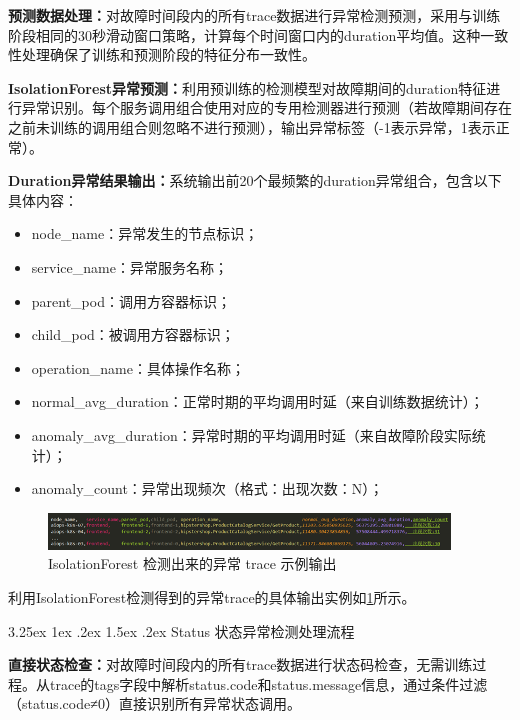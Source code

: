 \documentclass[11pt]{article}
\makeatletter
\renewcommand{\paragraph}{%
    \@startsection{paragraph}{4}{\z@}%
    {3.25ex \@plus1ex \@minus.2ex}%
    {1.5ex \@plus.2ex}%
    {\normalfont\normalsize\bfseries}%
}
\makeatother
\begin{document}
\textbf{预测数据处理：}对故障时间段内的所有trace数据进行异常检测预测，采用与训练阶段相同的30秒滑动窗口策略，计算每个时间窗口内的duration平均值。这种一致性处理确保了训练和预测阶段的特征分布一致性。

\textbf{IsolationForest异常预测：}利用预训练的检测模型对故障期间的duration特征进行异常识别。每个服务调用组合使用对应的专用检测器进行预测（若故障期间存在之前未训练的调用组合则忽略不进行预测），输出异常标签（-1表示异常，1表示正常）。

\textbf{Duration异常结果输出：}系统输出前20个最频繁的duration异常组合，包含以下具体内容：

\begin{itemize}
    \item node\_name：异常发生的节点标识；
    \item service\_name：异常服务名称；
    \item parent\_pod：调用方容器标识；
    \item child\_pod：被调用方容器标识；
    \item operation\_name：具体操作名称；
    \item normal\_avg\_duration：正常时期的平均调用时延（来自训练数据统计）；
    \item anomaly\_avg\_duration：异常时期的平均调用时延（来自故障阶段实际统计）；
    \item anomaly\_count：异常出现频次（格式：出现次数：N）；
\end{itemize}

\begin{figure}[htbp]
    \centering
    \includegraphics[width=0.95\textwidth]{pics/fig10.png}
    \caption{IsolationForest 检测出来的异常 trace 示例输出}
    \label{fig10}
\end{figure}

利用IsolationForest检测得到的异常trace的具体输出实例如\ref{fig10}所示。

\paragraph{Status 状态异常检测处理流程}

\textbf{直接状态检查：}对故障时间段内的所有trace数据进行状态码检查，无需训练过程。从trace的tags字段中解析status.code和status.message信息，通过条件过滤（status.code≠0）直接识别所有异常状态调用。
\end{document}
